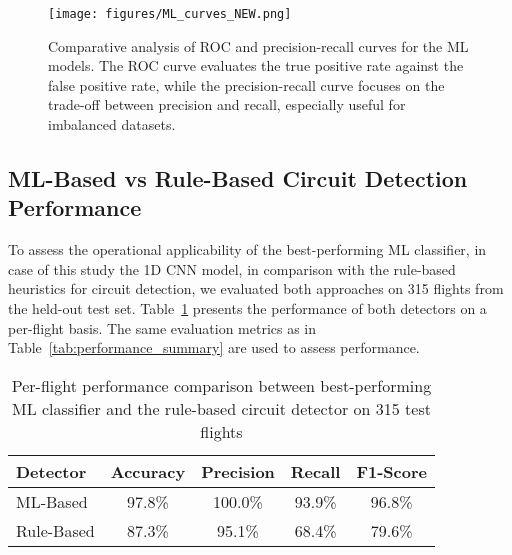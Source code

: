 \documentclass[
  manuscript=proceedings,  %
  layout=preprint,         %
  year=2025,
  volume=x,
]{extra/joas}
\begin{document}

\vspace{-0.11cm}
\begin{figure}
    \centering
    \texttt{[image: figures/ML\_curves\_NEW.png]}
    \vspace{-2em}
    \caption{Comparative analysis of ROC and precision-recall curves for the ML models. The ROC curve evaluates the true positive rate against the false positive rate, while the precision-recall curve focuses on the trade-off between precision and recall, especially useful for imbalanced datasets.}
    \label{fig:comparison}
\end{figure}

\subsection{ML-Based vs Rule-Based Circuit Detection Performance}
To assess the operational applicability of the best-performing ML classifier, in case of this study the 1D CNN model, in comparison with the rule-based heuristics for circuit detection, we evaluated both approaches on 315 flights from the held-out test set. Table~\ref{tab:ml_vs_rule} presents the performance of both detectors on a per-flight basis. The same evaluation metrics as in Table~\ref{tab:performance_summary} are used to assess performance.

\begin{table}[h!]
\centering
\caption{Per-flight performance comparison between best-performing ML classifier and the rule-based circuit detector on 315 test flights}
\label{tab:ml_vs_rule}
\begin{tabular}{lcccc}
\toprule
\textbf{Detector} & \textbf{Accuracy} & \textbf{Precision} & \textbf{Recall} & \textbf{F1-Score} \\
\midrule
ML-Based    & 97.8\%    & 100.0\%   & 93.9\%    & 96.8\% \\
Rule-Based  & 87.3\%    & 95.1\%    & 68.4\%    & 79.6\% \\
\bottomrule
\end{tabular}
\end{table}
\end{document}

